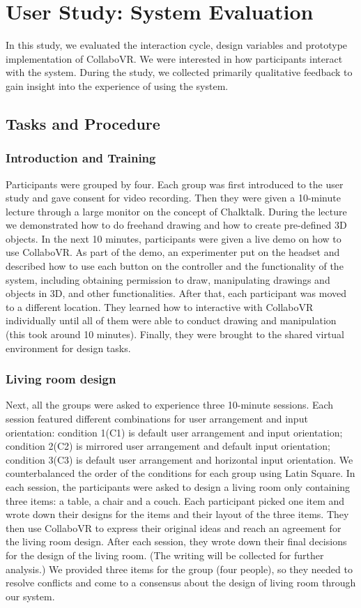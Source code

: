 \documentclass{sigchi}
\begin{document}
\section{User Study: System Evaluation}

In this study, we evaluated the interaction cycle, design variables and prototype implementation of CollaboVR. We were interested in how participants interact with the system. During the study, we collected primarily qualitative feedback to gain insight into the experience of using the system.

\subsection{Tasks and Procedure}
\subsubsection{Introduction and Training}
Participants were grouped by four. Each group was first introduced to the user study and gave consent for video recording. Then they were given a 10-minute lecture through a large monitor on the concept of Chalktalk. During the lecture we demonstrated how to do freehand drawing and how to create pre-defined 3D objects.
In the next 10 minutes, participants were given a live demo on how to use CollaboVR. As part of the demo, an experimenter put on the headset and described how to use each button on the controller and the functionality of the system, including obtaining permission to draw, manipulating drawings and objects in 3D, and other functionalities.
After that, each participant was moved to a different location. They learned how to interactive with CollaboVR individually until all of them were able to conduct drawing and manipulation (this took around 10 minutes). Finally, they were brought to the shared virtual environment for design tasks. 

\subsubsection{Living room design}
Next, all the groups were asked to experience three 10-minute sessions. 
Each session featured different combinations for user arrangement and input orientation: condition 1(C1) is default user arrangement and input orientation; condition 2(C2) is mirrored user arrangement and default input orientation; condition 3(C3) is default user arrangement and horizontal input orientation.
We counterbalanced the order of the conditions for each group using Latin Square. In each session, the participants were asked to design a living room only containing three items: a table, a chair and a couch. 
Each participant picked one item and wrote down their designs for the items and their layout of the three items. They then use CollaboVR to express their original ideas and reach an agreement for the living room design. After each session, they wrote down their final decisions for the design of the living room. (The writing will be collected for further analysis.)
We provided three items for the group (four people), so they needed to resolve conflicts and come to a consensus about the design of living room through our system.
\end{document}
